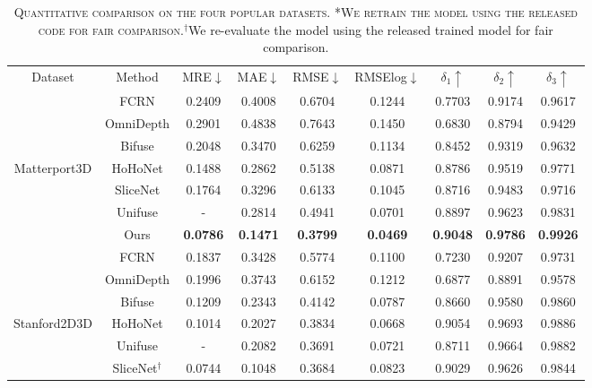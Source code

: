 \documentclass[10pt,times,mathptm,psfig,twocolumn,journals]{IEEEtran}
\begin{document}
\begin{table*}[t]
\begin{center}
\caption{\textsc{Quantitative comparison on the four popular datasets. *We retrain the model using the released code for fair comparison.$^{\dag}$}We re-evaluate the model using the released trained model for fair comparison. }
\label{table:c1}
\begin{tabular}{ccccccccc}
\hline\noalign{\smallskip}
Dataset&Method & MRE$\downarrow$ & MAE$\downarrow$ & RMSE$\downarrow$ & RMSElog$\downarrow$ & $\delta_{1}\uparrow$ & $\delta_{2}\uparrow$ & $\delta_{3}\uparrow$\\
\noalign{\smallskip}
\hline
\hline
&FCRN\cite{laina2016deeper}       & 0.2409  & 0.4008 & 0.6704 & 0.1244 & 0.7703 &0.9174 &0.9617     \\
&OmniDepth\cite{zioulis2018omnidepth} & 0.2901  & 0.4838 & 0.7643 & 0.1450 & 0.6830 & 0.8794 & 0.9429      \\
&Bifuse\cite{2020BiFuse}    & 0.2048  & 0.3470 & 0.6259 & 0.1134 &0.8452 & 0.9319 & 0.9632     \\
Matterport3D&HoHoNet\cite{sun2021hohonet}   & 0.1488  & 0.2862 & 0.5138 & 0.0871 & 0.8786 & 0.9519 & 0.9771    \\
&SliceNet\cite{Pintore_2021_CVPR}   & 0.1764  & 0.3296 & 0.6133 & 0.1045 & 0.8716 & 0.9483 & 0.9716    \\
&Unifuse\cite{Jiang_2021} & -  & 0.2814 & 0.4941 & 0.0701 & 0.8897 & 0.9623 & 0.9831\\
&Ours   & \textbf{0.0786}  & \textbf{0.1471} & \textbf{0.3799} & \textbf{0.0469} & \textbf{0.9048} & \textbf{0.9786} & \textbf{0.9926}    \\
\hline
\noalign{\smallskip}
\hline
&FCRN\cite{laina2016deeper}       & 0.1837  & 0.3428 & 0.5774 & 0.1100 & 0.7230 &0.9207 &0.9731     \\
&OmniDepth\cite{zioulis2018omnidepth} & 0.1996  & 0.3743 & 0.6152 & 0.1212 & 0.6877 & 0.8891 & 0.9578      \\
&Bifuse\cite{2020BiFuse}    & 0.1209  & 0.2343 & 0.4142 & 0.0787 &0.8660 & 0.9580 & 0.9860     \\
Stanford2D3D&HoHoNet\cite{sun2021hohonet}   & 0.1014  & 0.2027 & 0.3834 & 0.0668 & 0.9054 & 0.9693 & 0.9886    \\
&Unifuse\cite{Jiang_2021} & -  & 0.2082 & 0.3691 & 0.0721 & 0.8711 & 0.9664 & 0.9882\\
&SliceNet$^{\dag}$\cite{Pintore_2021_CVPR}   & 0.0744  & 0.1048 & 0.3684 & 0.0823 & 0.9029 & 0.9626 & 0.9844    \\

\end{tabular}
\end{center}
\end{table*}
\end{document}

